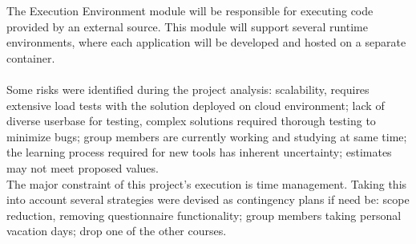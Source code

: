 The Execution Environment module will be responsible for executing code provided by an external source. This module will support several runtime environments, where each application will be developed and hosted on a separate container.
\\
\\
Some risks were identified during the project analysis: scalability, requires extensive load tests with the solution deployed on cloud environment; lack of diverse userbase for testing, complex solutions required thorough testing to minimize bugs; group members are currently working and studying at same time; the learning process required for new tools has inherent uncertainty; estimates may not meet proposed values.
\\
The major constraint of this project's execution is time management. Taking this into account several strategies were devised as contingency plans if need be: scope reduction, removing questionnaire functionality; group members taking personal vacation days; drop one of the other courses.